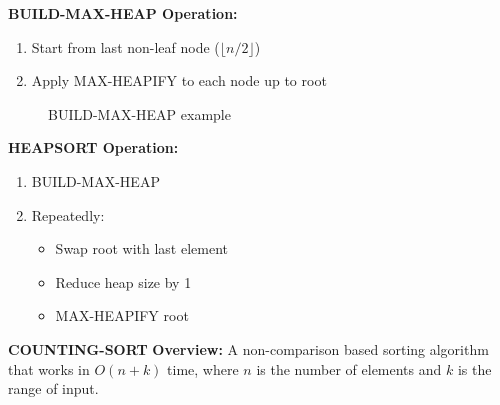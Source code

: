 \textbf{BUILD-MAX-HEAP Operation:}
\begin{enumerate}
    \item Start from last non-leaf node ($\lfloor n/2 \rfloor$)
    \item Apply MAX-HEAPIFY to each node up to root
\end{enumerate}

\begin{figure}[H]
    \centering
    \caption*{\footnotesize BUILD-MAX-HEAP example}
\end{figure}

\textbf{HEAPSORT Operation:}
\begin{enumerate}
    \item BUILD-MAX-HEAP
    \item Repeatedly:
        \begin{itemize}[noitemsep,topsep=0pt]
            \item Swap root with last element
            \item Reduce heap size by 1
            \item MAX-HEAPIFY root
        \end{itemize}
\end{enumerate}

\textbf{COUNTING-SORT}
\textbf{Overview:} A non-comparison based sorting algorithm that works in $O(n + k)$ time, where $n$ is the number of elements and $k$ is the range of input.

